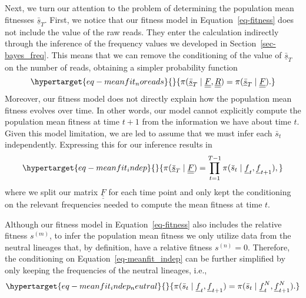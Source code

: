 \documentclass[
  letterpaper,
  DIV=11,
  numbers=noendperiod]{scrartcl}
\begin{document}
\begin{refsegment}
Next, we turn our attention to the problem of determining the population
mean fitnesses \(\underline{\bar{s}}_T\). First, we notice that our
fitness model in Equation~\ref{eq-fitness} does not include the value of
the raw reads. They enter the calculation indirectly through the
inference of the frequency values we developed in
Section~\ref{sec-bayes_freq}. This means that we can remove the
conditioning of the value of \(\underline{\bar{s}}_T\) on the number of
reads, obtaining a simpler probability function
\begin{equation}\protect\hypertarget{eq-meanfit_noreads}{}{
\pi(
    \underline{\bar{s}}_T \mid 
    \underline{\underline{F}}, \underline{\underline{R}}
) = 
\pi(
    \underline{\bar{s}}_T \mid 
    \underline{\underline{F}}
).
}\label{eq-meanfit_noreads}\end{equation} Moreover, our fitness model
does not directly explain how the population mean fitness evolves over
time. In other words, our model cannot explicitly compute the population
mean fitness at time \(t+1\) from the information we have about time
\(t\). Given this model limitation, we are led to assume that we must
infer each \(\bar{s}_t\) independently. Expressing this for our
inference results in
\begin{equation}\protect\hypertarget{eq-meanfit_indep}{}{
\pi(
    \underline{\bar{s}}_T \mid 
    \underline{\underline{F}}
) =
\prod_{t=1}^{T-1} \pi(\bar{s}_t \mid \underline{f}_t, \underline{f}_{t+1}),
}\label{eq-meanfit_indep}\end{equation} where we split our matrix
\(\underline{\underline{F}}\) for each time point and only kept the
conditioning on the relevant frequencies needed to compute the mean
fitness at time \(t\).

Although our fitness model in Equation~\ref{eq-fitness} also includes
the relative fitness \(s^{(m)}\), to infer the population mean fitness
we only utilize data from the neutral lineages that, by definition, have
a relative fitness \(s^{(n)} = 0\). Therefore, the conditioning on
Equation~\ref{eq-meanfit_indep} can be further simplified by only
keeping the frequencies of the neutral lineages, i.e.,
\begin{equation}\protect\hypertarget{eq-meanfit_indep_neutral}{}{
\pi(\bar{s}_t \mid \underline{f}_t, \underline{f}_{t+1}) =
\pi(\bar{s}_t \mid \underline{f}_t^N, \underline{f}_{t+1}^N).
}\label{eq-meanfit_indep_neutral}\end{equation}


\end{refsegment}
\end{document}
